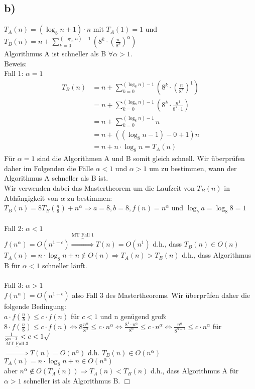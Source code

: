 \documentclass[a4paper]{scrartcl}
\begin{document}
\subsection*{b)}
$T_A(n)=(\log_{8}n+1)\cdot n$ mit $T_A(1)=1$ und $T_B(n)=n + \sum_{k=0}^{(\log_{8}n)-1} (8^k \cdot (\frac{n}{8^k})^{\alpha})$\\
Algorithmus A ist schneller als B $\forall \alpha > 1$.\\
Beweis:\\
Fall 1: $\alpha = 1$\\
\begin{align*}
T_B(n)&=n + \sum_{k=0}^{(\log_{8}n)-1} (8^k \cdot (\frac{n}{8^k})^{1})\\
&=n + \sum_{k=0}^{(\log_{8}n)-1} (8^k \cdot \frac{n^1}{8^k\cdot1})\\
&=n + \sum_{k=0}^{(\log_{8}n)-1} n\\
&=n+((\log_{8}n-1)-0+1)n\\
&=n+n\cdot \log_{8}n = T_A(n)
\end{align*}
Für $\alpha =1$ sind die Algorithmen A und B somit gleich schnell. Wir überprüfen daher im Folgenden die Fälle $\alpha <1$ und $\alpha >1$ um zu bestimmen, wann der Algorithmus A schneller als B ist.\\
Wir verwenden dabei das Mastertheorem um die Laufzeit von $T_B(n)$ in Abhängigkeit von $\alpha$ zu bestimmen: $T_B(n)=8T_B(\frac{n}{8})+n^{\alpha} \Rightarrow a=8, b=8, f(n)=n^{\alpha}$ und $\log_{b}a=\log_{8}8=1$\\
\\
Fall 2: $\alpha < 1$\\
$f(n^{\alpha})=O(n^{1- \epsilon}) \overbrace{\Rightarrow}^{\textrm{MT Fall 1}} T(n)=O(n^1)$ d.h., dass $T_B(n)\in O(n)$\\
$T_A(n)=n\cdot \log_{8}n+n \notin O(n) \Rightarrow T_A(n) > T_B(n)$ d.h., dass Algorithmus B für $\alpha < 1$ schneller läuft.\\
\\
Fall 3: $\alpha > 1$\\
$f(n^{\alpha})=O(n^{1+ \epsilon})$ also Fall 3 des Mastertheorems. Wir überprüfen daher die folgende Bedingung:\\
$a\cdot f(\frac{n}{b}) \le c \cdot f(n)$ für $ c<1$ und n genügend groß:\\
$8\cdot f(\frac{n}{8}) \le c \cdot f(n) \Leftrightarrow 8\frac{n^{\alpha}}{8^{\alpha}} \le c \cdot n^{\alpha}\Leftrightarrow \frac{8^1 \cdot n^{\alpha}}{8^{\alpha}} \le c \cdot n^{\alpha} \Leftrightarrow \frac{n^{\alpha}}{8^{\alpha-1}} \le c \cdot n^{\alpha}$ für $\frac{1}{8^{\alpha-1}} <c<1 \surd$\\
$\overbrace{\Rightarrow}^{\textrm{MT Fall 3}} T(n)=O(n^{\alpha})$ d.h. $T_B(n) \in O(n^{\alpha})$
$T_A(n)=n\cdot \log_{8}n+n \in O(n^{\alpha})$\\ aber $n^{\alpha} \notin O(T_A(n)) \Rightarrow T_A(n) < T_B(n)$ d.h., dass Algorithmus A für $\alpha > 1$ schneller ist als Algorithmus B. $\Box$
\end{document}
